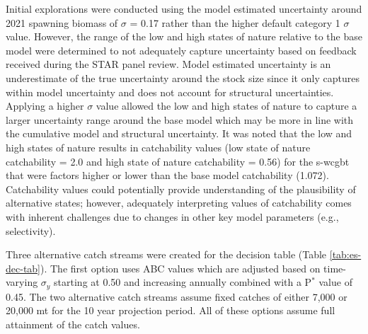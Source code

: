 \documentclass[11pt,
  english,
  a4paper,
]{article}
\begin{document}
\leavevmode\tagmcend\tagstructend\par


Initial explorations were conducted using the model estimated uncertainty around 2021 spawning biomass of {\(\sigma\)\leavevmode\tagmcend\tagstructend} = 0.17 rather than the higher default category 1 {\(\sigma\)\leavevmode\tagmcend\tagstructend} value. However, the range of the low and high states of nature relative to the base model were determined to not adequately capture uncertainty based on feedback received during the STAR panel review. Model estimated uncertainty is an underestimate of the true uncertainty around the stock size since it only captures within model uncertainty and does not account for structural uncertainties. Applying a higher {\(\sigma\)\leavevmode\tagmcend\tagstructend} value allowed the low and high states of nature to capture a larger uncertainty range around the base model which may be more in line with the cumulative model and structural uncertainty. It was noted that the low and high states of nature results in catchability values (low state of nature catchability = 2.0 and high state of nature catchability = 0.56) for the \gls{s-wcgbt} that were factors higher or lower than the base model catchability (1.072). Catchability values could potentially provide understanding of the plausibility of alternative states; however, adequately interpreting values of catchability comes with inherent challenges due to changes in other key model parameters (e.g., selectivity).

\leavevmode\tagmcend\tagstructend\par


Three alternative catch streams were created for the decision table (Table \ref{tab:es-dec-tab}). The first option uses ABC values which are adjusted based on time-varying {\(\sigma_y\)\leavevmode\tagmcend\tagstructend} starting at 0.50 and increasing annually combined with a P{\(^*\)\leavevmode\tagmcend\tagstructend} value of 0.45. The two alternative catch streams assume fixed catches of either 7,000 or 20,000 mt for the 10 year projection period. All of these options assume full attainment of the catch values.
\end{document}
